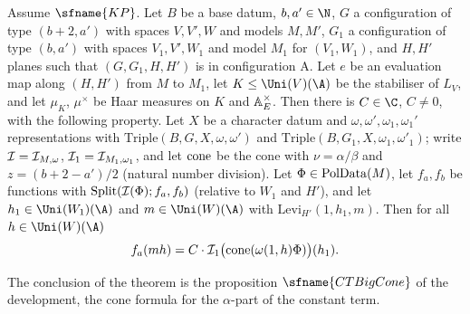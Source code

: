 \begin{theorem}\label{pf:thmK-cone:main}
Assume $\sfname{KP}$.  Let $B$ be a base datum, $b,a'\in\N$, $G$ a configuration of type $(b+2,a')$ with spaces $V,V',W$
and models $M,M'$, $G_1$ a configuration of type $(b,a')$ with spaces $V_1,V',W_1$ and model $M_1$ for $(V_1,W_1)$, and
$H,H'$ planes such that $(G,G_1,H,H')$ is in configuration A.  Let $e$ be an evaluation map along $(H,H')$ from $M$ to
$M_1$, let $K\le\Uni(V)(\A)$ be the stabiliser of $L_V$, and let $\mu_K$, $\mu^\times$ be Haar measures on $K$ and
$\mathbb{A}_E^\times$.  Then there is $C\in\C$, $C\neq0$, with the following property.  Let $X$ be a character datum and
$\omega,\omega',\omega_1,\omega_1'$ representations with $\mathrm{Triple}(B,G,X,\omega,\omega')$ and
$\mathrm{Triple}(B,G_1,X,\omega_1,\omega'_1)$; write $\mathcal{I}=\mathcal{I}_{M,\omega}$, $\mathcal{I}_1=\mathcal{I}_{M_1,\omega_1}$,
and let $\operatorname{cone}$ be the cone with $\nu=\alpha/\beta$ and $z=(b+2-a')/2$ (natural number division).  Let
$\Phi\in\operatorname{PolData}(M)$, let $f_a,f_b$ be functions with $\mathrm{Split}(\mathcal{I}(\Phi);f_a,f_b)$ (relative to $W_1$ and
$H'$), and let $h_1\in\Uni(W_1)(\A)$ and $m\in\Uni(W)(\A)$ with $\mathrm{Levi}_{H'}(1,h_1,m)$.  Then for all
$h\in\Uni(W)(\A)$
\begin{equation}\label{pf:thmK-cone:eq-main}
  f_a(mh)=C\cdot\mathcal{I}_1\bigl(\operatorname{cone}(\omega(1,h)\Phi)\bigr)(h_1).
\end{equation}
\end{theorem}

The conclusion of the theorem is the proposition $\sfname{CTBigCone}$ of the development, the cone formula for the
$\alpha$-part of the constant term.

